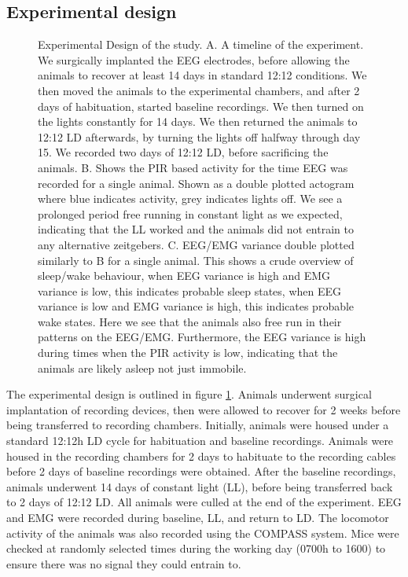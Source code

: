 \subsection{Experimental design}
\begin{landscape}
\begin{figure}[p]
    \centering
\caption[Experimental Design]{
Experimental Design of the study.
A. A timeline of the experiment.
We surgically implanted the EEG electrodes, before allowing the animals to
recover at least 14 days in standard 12:12 conditions.
We then moved the animals to the experimental chambers, and after 2 days of
habituation, started baseline recordings.
We then turned on the lights constantly for 14 days.
We then returned the animals to 12:12 LD afterwards, by turning the lights
off halfway through day 15.
We recorded two days of 12:12 LD, before sacrificing the animals.
B. Shows the PIR based activity for the time EEG was recorded for a single
animal.
Shown as a double plotted actogram where blue indicates activity, grey
indicates lights off.
We see a prolonged period free running in constant light as we expected,
indicating that the LL worked and the animals did not entrain to any
alternative zeitgebers.
C. EEG/EMG variance double plotted similarly to B for a single animal.
This shows a crude overview of sleep/wake behaviour, when EEG variance is
high and EMG variance is low, this indicates probable sleep states, when EEG
variance is low and EMG variance is high, this indicates probable wake states.
Here we see that the animals also free run in their patterns on the EEG/EMG.
Furthermore, the EEG variance is high during times when the PIR activity is
low, indicating that the animals are likely asleep not just immobile.
}
    \label{fig:design}
\end{figure}
\end{landscape}

The experimental design is outlined in figure \ref{fig:design}.
Animals underwent surgical implantation of recording devices, then were
allowed to recover for 2 weeks before being transferred to recording chambers.
Initially, animals were housed under a standard 12:12h LD cycle for 
habituation and baseline recordings.
Animals were housed in the recording chambers for 2 days to habituate to the
recording cables before 2 days of baseline recordings were obtained.
After the baseline recordings, animals underwent 14 days of constant light
(LL), before being transferred back to 2 days of 12:12 LD.
All animals were culled at the end of the experiment.
EEG and EMG were recorded during baseline, LL, and return to LD.
The locomotor activity of the animals was also recorded using the COMPASS
system\cite{brown_compass_2017}.
Mice were checked at randomly selected times during the working day (0700h to
1600) to ensure there was no signal they could entrain to.

